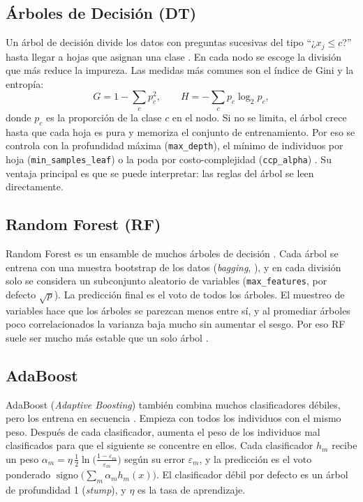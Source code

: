\documentclass[11pt,a4paper]{article}
\let\citepOriginal\citep
\renewcommand*{\citep}[1]{\textbf{\citepOriginal{#1}}}%
\let\citealpOriginal\citealp
\renewcommand*{\citealp}[1]{\textbf{\citealpOriginal{#1}}}%
\begin{document}
\subsection{Árboles de Decisión (DT)}
Un árbol de decisión divide los datos con preguntas sucesivas del tipo ``¿$x_j\le c$?'' hasta llegar a hojas que asignan una clase \citep{breiman1984,quinlan1986}. En cada nodo se escoge la división que más reduce la impureza. Las medidas más comunes son el índice de Gini y la entropía:
\[
G=1-\sum_{c}p_c^{2},\qquad H=-\sum_{c}p_c\log_2 p_c ,
\]
donde $p_c$ es la proporción de la clase $c$ en el nodo. Si no se limita, el árbol crece hasta que cada hoja es pura y memoriza el conjunto de entrenamiento. Por eso se controla con la profundidad máxima (\texttt{max\_depth}), el mínimo de individuos por hoja (\texttt{min\_samples\_leaf}) o la poda por costo-complejidad (\texttt{ccp\_alpha}) \citep{breiman1984}. Su ventaja principal es que se puede interpretar: las reglas del árbol se leen directamente.

\subsection{Random Forest (RF)}
Random Forest es un ensamble de muchos árboles de decisión \citep{breiman2001}. Cada árbol se entrena con una muestra bootstrap de los datos (\textit{bagging}, \citealp{breiman1996}), y en cada división solo se considera un subconjunto aleatorio de variables (\texttt{max\_features}, por defecto $\sqrt{p}$). La predicción final es el voto de todos los árboles. El muestreo de variables hace que los árboles se parezcan menos entre sí, y al promediar árboles poco correlacionados la varianza baja mucho sin aumentar el sesgo. Por eso RF suele ser mucho más estable que un solo árbol \citep{hastie2009}.

\subsection{AdaBoost}
AdaBoost (\textit{Adaptive Boosting}) también combina muchos clasificadores débiles, pero los entrena en secuencia \citep{freund1997}. Empieza con todos los individuos con el mismo peso. Después de cada clasificador, aumenta el peso de los individuos mal clasificados para que el siguiente se concentre en ellos. Cada clasificador $h_m$ recibe un peso $\alpha_m=\eta\,\tfrac12\ln\!\big(\tfrac{1-\varepsilon_m}{\varepsilon_m}\big)$ según su error $\varepsilon_m$, y la predicción es el voto ponderado $\operatorname{signo}\big(\sum_m\alpha_m h_m(x)\big)$. El clasificador débil por defecto es un árbol de profundidad 1 (\textit{stump}), y $\eta$ es la tasa de aprendizaje.
\end{document}
